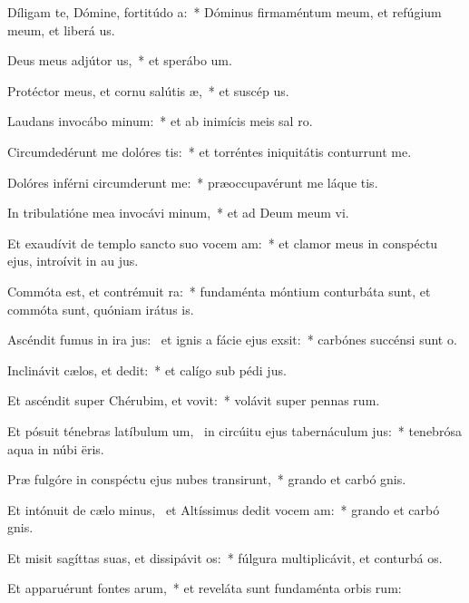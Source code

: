 \item Díligam te, Dómine, fortitúdo a:~* Dóminus firmaméntum meum, et refúgium meum, et liberá us.
\item Deus meus adjútor us,~* et sperábo  um.
\item Protéctor meus, et cornu salútis æ,~* et suscép us.
\item Laudans invocábo minum:~* et ab inimícis meis sal ro.
\item Circumdedérunt me dolóres tis:~* et torréntes iniquitátis conturrunt me.
\item Dolóres inférni circumderunt me:~* præoccupavérunt me láque tis.
\item In tribulatióne mea invocávi minum,~* et ad Deum meum vi.
\item Et exaudívit de templo sancto suo vocem am:~* et clamor meus in conspéctu ejus, introívit in au jus.
\item Commóta est, et contrémuit ra:~* fundaménta móntium conturbáta sunt, et commóta sunt, quóniam irátus  is.
\item Ascéndit fumus in ira jus:~\pscross{} et ignis a fácie ejus exsit:~* carbónes succénsi sunt  o.
\item Inclinávit cælos, et dedit:~* et calígo sub pédi jus.
\item Et ascéndit super Chérubim, et vovit:~* volávit super pennas rum.
\item Et pósuit ténebras latíbulum um,~\pscross{} in circúitu ejus tabernáculum jus:~* tenebrósa aqua in núbi ëris.
\item Præ fulgóre in conspéctu ejus nubes transirunt,~* grando et carbó gnis.
\item Et intónuit de cælo minus,~\pscross{} et Altíssimus dedit vocem am:~* grando et carbó gnis.
\item Et misit sagíttas suas, et dissipávit os:~* fúlgura multiplicávit, et conturbá os.
\item Et apparuérunt fontes arum,~* et reveláta sunt fundaménta orbis rum:
